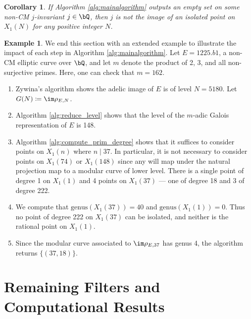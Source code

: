 \documentclass[11pt,reqno]{amsart}
\theoremstyle{plain}
\newtheorem{corollary}[theorem]{Corollary}
\theoremstyle{definition}
\newtheorem{example}[theorem]{Example}
\newcommand{\Q}{\bQ}
\begin{document}
\begin{corollary}\label{cor:P1_isolated}
If Algorithm \ref{alg:mainalgorithm} outputs an empty set on some non-CM $j$-invariant $j \in \Q$, then $j$ is not the image of an  isolated point on $X_1(N)$ for any positive integer $N$.
\end{corollary}

\begin{example}
We end this section with an extended example to illustrate the impact of each step in Algorithm \ref{alg:mainalgorithm}. Let $E=1225.b1$, a non-CM elliptic curve over $\Q$, and let $m$ denote the product of 2, 3, and all non-surjective primes. Here, one can check that $m=162$.
\begin{enumerate}
\item Zywina's algorithm shows the adelic image of $E$ is of level $N=5180$. Let $G(N) \coloneqq \im \rho_{E,N}$.
\item Algorithm \ref{alg:reduce_level} shows that the level of the $m$-adic Galois representation of $E$ is 148.
\item Algorithm \ref{alg:compute_prim_degree} shows that it suffices to consider points on $X_1(n)$ where $n \mid 37$. In particular, it is not necessary to consider points on $X_1(74)$ or $X_1(148)$ since any will map under the natural projection map to a modular curve of lower level. There is a single point of degree 1 on $X_1(1)$ and 4 points on $X_1(37)$ --- one of degree 18 and 3 of degree 222.
\item We compute that $\text{genus}(X_1(37))=40$ and  $\text{genus}(X_1(1))=0$. Thus no point of degree 222 on $X_1(37)$ can be isolated, and neither is the rational point on $X_1(1)$.
\item Since the modular curve associated to $\im \rho_{E,37}$ has genus 4, the algorithm returns $ \{( 37, 18)\}$.
\end{enumerate}
\end{example}

\section{Remaining Filters and Computational Results}
\label{sec:remainingfilters}
\end{document}
